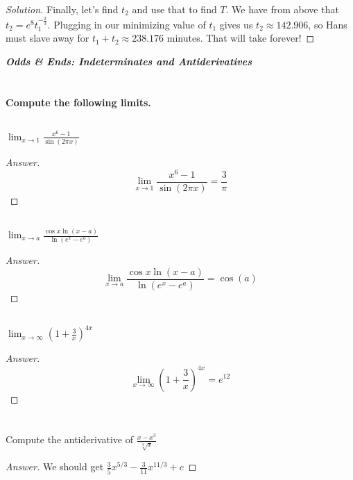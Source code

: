 \documentclass[english]{article}
\newcommand{\prob}[1]{\setcounter{section}{#1-1}\section{}}
\newcommand{\prt}[1]{\setcounter{subsection}{#1-1}\subsection{}}
\theoremstyle{remark}
\theoremstyle{definition}
\newcommand{\ild}[1]{\displaystyle{#1}}
\begin{document}
\begin{proof}[Solution]
	Finally, let's find $t_2$ and use that to find $T$. We have from above that $t_2=e^8t_1^{-\frac{2}{3}}$. Plugging in our minimizing value of $t_1$ gives us $t_2\approx 142.906$, so Hans must slave away for $t_1+t_2\approx 238.176$ minutes. That will take forever!
\end{proof}
	\newpage

	\begin{center}{\Large\textbf{\emph{Odds \& Ends: Indeterminates and Antiderivatives}}}\end{center}
	\prob{12} \textbf{Compute the following limits.}
	\prt{1}$\ild{\lim_{x\to 1}\frac{x^6-1}{\sin(2\pi x)}}$\begin{proof}[Answer]
		$$\lim_{x\to 1}\frac{x^6-1}{\sin(2\pi x)}=\frac{3}{\pi}$$
	\end{proof}
	\prt{2}$\ild{\lim_{x\to a}\frac{\cos x \ln (x-a)}{\ln(e^x-e^a)}}$\begin{proof}[Answer]
		$$\lim_{x\to a}\frac{\cos x \ln (x-a)}{\ln (e^x-e^a)}=\cos(a)$$
	\end{proof}
	\prt{3} $\ild{\lim_{x\to \infty} \left(1+\frac{3}{x}\right)^{4x}}$
\begin{proof}[Answer] $${\lim_{x\to \infty} \left(1+\frac{3}{x}\right)^{4x}}=e^{12}$$
	\end{proof}
	\prob{13} Compute the antiderivative of $\ild{\frac{x-x^3}{\sqrt[3]{x}}}$
	
	\begin{proof}[Answer]
		We should get $\frac{3}{5}x^{5/3}-\frac{3}{11}x^{11/3}+c$
	\end{proof}
\end{document}
